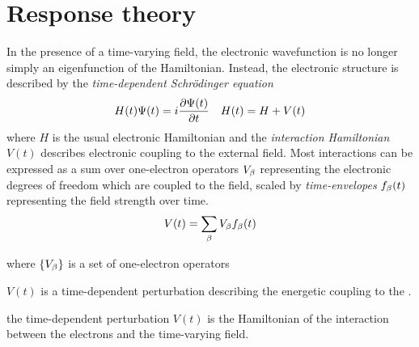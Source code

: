 \documentclass[11pt]{article}
\numberwithin{equation}{section}
\begin{document}
\setlength{\abovedisplayskip}{5pt}
\setlength{\belowdisplayskip}{5pt}


\setcounter{section}{8}
\section{Response theory}

\begin{rmk}
In the presence of a time-varying field, the electronic wavefunction is no longer simply an eigenfunction of the Hamiltonian.
Instead, the electronic structure is described by the \textit{time-dependent Schr\"odinger equation}
\begin{align}
\label{eq:schrodinger-equation}
  H(t)
  \Psi (t)
=
  i
  \frac {\partial\Psi (t)}{\partial t}
&&
  H(t)
=
  H
+
  V(t)
\end{align}
where $H$ is the usual electronic Hamiltonian and the \textit{interaction Hamiltonian} $V(t)$ describes electronic coupling to the external field.
Most interactions can be expressed as a sum over one-electron operators $V_{\beta }$ representing the electronic degrees of freedom which are coupled to the field, scaled by \textit{time-envelopes} $f_{\beta }(t)$ representing the field strength over time.
\begin{align}
  V(t)
=
  \sum_{\beta }
  V_{\beta }
  f_{\beta }(t)
\end{align}



where $\{V_{\beta }\}$ is a set of one-electron operators 

$V(t)$ is a time-dependent perturbation describing the energetic coupling to the .


 the time-dependent perturbation $V(t)$ is the Hamiltonian of the interaction between the electrons and the time-varying field.
\end{rmk}
\end{document}
